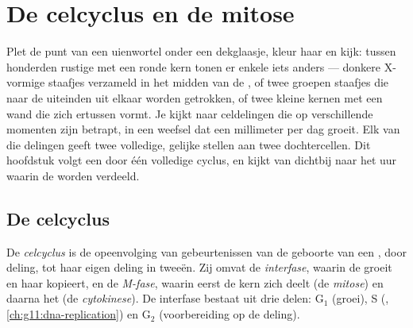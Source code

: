 \chapter{De celcyclus en de mitose}\label{ch:g11:cell-cycle-mitosis}

Plet de punt van een uienwortel onder een dekglaasje, kleur haar en kijk:
tussen honderden rustige  met een ronde kern tonen er enkele iets
anders --- donkere X-vormige staafjes verzameld in het midden van de ,
of twee groepen staafjes die naar de uiteinden uit elkaar worden
getrokken, of twee kleine kernen met een wand die zich ertussen vormt. Je
kijkt naar celdelingen die op verschillende momenten zijn betrapt, in een
weefsel dat een millimeter per dag groeit. Elk van die delingen geeft twee
volledige, gelijke stellen  aan twee dochtercellen. Dit
hoofdstuk volgt een  door één volledige cyclus, en kijkt van dichtbij
naar het uur waarin de  worden verdeeld.

\section{De celcyclus}

\begin{definition}[Celcyclus]\label{def:g11:cell-cycle-mitosis:cycle}
De \emph{celcyclus} is de opeenvolging van
gebeurtenissen van de geboorte van een , door deling, tot haar eigen
deling in tweeën. Zij omvat de \emph{interfase}, waarin de  groeit en
haar  kopieert, en de \emph{M-fase}, waarin eerst de kern zich deelt
(de \emph{mitose}) en daarna het  (de
\emph{cytokinese}). De interfase bestaat uit drie delen: $\mathrm{G_1}$
(groei), S (, \cref{ch:g11:dna-replication}) en
$\mathrm{G_2}$ (voorbereiding op de deling).
\end{definition}

